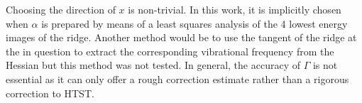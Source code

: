 Choosing the direction of $x$ is non-trivial.
In this work, it is implicitly chosen when $\alpha$ is prepared by means of a least squares analysis of the 4 lowest energy images of the ridge.
Another method would be to use the tangent of the ridge at the  in question to extract the corresponding vibrational frequency from the Hessian but this method was not tested.
In general, the accuracy of $\Gamma$ is not essential as it can only offer a rough correction estimate rather than a rigorous correction to HTST.
